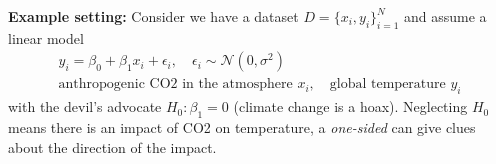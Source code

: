 \textbf{Example setting:} Consider we have a dataset $D=\{ x_i,y_i \}_{i=1}^N$ and assume a linear model
\begin{equation}
    \begin{gathered}
        y_i = \beta_0 + \beta_1 x_i + \epsilon_i, \quad \epsilon_i \sim \mathcal{N}(0,\sigma^2) \\
        \text{anthropogenic CO2 in the atmosphere } x_i, \quad \text{global temperature } y_i
    \end{gathered}
\end{equation}
with the devil's advocate $H_0: \beta_1 = 0$ (climate change is a hoax). Neglecting
$H_0$ means there is an impact of CO2 on temperature, a \textit{one-sided} can give
clues about the direction of the impact.



